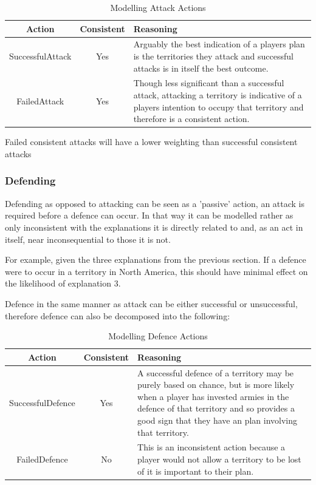 \documentclass[parskip]{cs4rep}
\begin{document}
\begin{table}[ht]
\centering
\begin{tabular}{|c|c|p{8cm}|}
\hline 
\textbf{Action} & \textbf{Consistent}  & \textbf{Reasoning} \\ 
\hline 
SuccessfulAttack & Yes & Arguably the best indication of a players plan is the territories they attack and successful attacks is in itself the best outcome. \\ 
\hline 
FailedAttack & Yes & Though less significant than a successful attack, attacking a territory is indicative of a players intention to occupy that territory and therefore is a consistent action.\\ 
\hline
\end{tabular}
\caption{Modelling Attack Actions}
\label{table:attack-defend-modelling}
\end{table}

Failed consistent attacks will have a lower weighting than successful consistent attacks

\newpage

\subsubsection{Defending}

Defending as opposed to attacking can be seen as a 'passive' action, an attack is required before a defence can occur. In that way it can be modelled rather as only inconsistent with the explanations it is directly related to and, as an act in itself, near inconsequential to those it is not.

For example, given the three explanations from the previous section. If a defence were to occur in a territory in North America, this should have minimal effect on the likelihood of explanation 3. 

Defence in the same manner as attack can be either successful or unsuccessful, therefore defence can also be decomposed into the following: 

\begin{table}[ht]
\centering
\begin{tabular}{|c|c|p{8cm}|}
\hline 
\textbf{Action} & \textbf{Consistent}  & \textbf{Reasoning} \\ 
\hline 
SuccessfulDefence & Yes & A successful defence of a territory may be purely based on chance, but is more likely when a player has invested armies in the defence of that territory and so provides a good sign that they have an plan involving that territory. \\ 
\hline 
FailedDefence & No & This is an inconsistent action because a player would not allow a territory to be lost of it is important to their plan. \\ 
\hline
\end{tabular}
\caption{Modelling Defence Actions}
\label{table:attack-defend-modelling}
\end{table}
\end{document}
